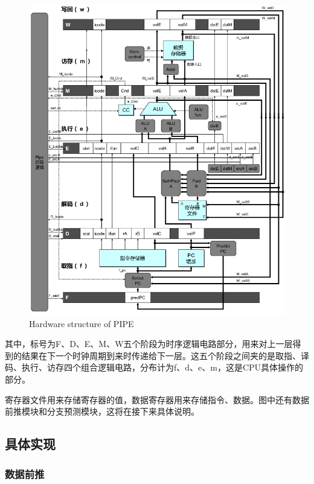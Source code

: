 \begin{figure}[htbp]
\centering
\includegraphics{img/pipe-full.png}
\caption{Hardware structure of PIPE}
\end{figure}

其中，标号为F、D、E、M、W五个阶段为时序逻辑电路部分，用来对上一层得到的结果在下一个时钟周期到来时传递给下一层。这五个阶段之间夹的是取指、译码、执行、访存四个组合逻辑电路，分布计为f、d、e、m，这是CPU具体操作的部分。

寄存器文件用来存储寄存器的值，数据寄存器用来存储指令、数据。图中还有数据前推模块和分支预测模块，这将在接下来具体说明。

\subsection{具体实现}\label{ux5177ux4f53ux5b9eux73b0}

\subsubsection{数据前推}\label{ux6570ux636eux524dux63a8}

